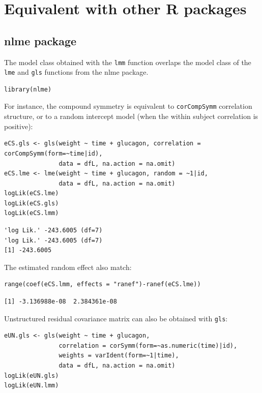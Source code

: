 \documentclass[12pt]{article}
\begin{document}
\clearpage

\section{Equivalent with other R packages}
\label{sec:orgfaaea55}

\subsection{nlme package}
\label{sec:org828ef19}

The model class obtained with the \texttt{lmm} function overlaps the model
class of the \texttt{lme} and \texttt{gls} functions from the nlme package.
\lstset{language=r,label= ,caption= ,captionpos=b,numbers=none}
\begin{lstlisting}
library(nlme)
\end{lstlisting}

For instance, the compound symmetry is equivalent to \texttt{corCompSymm}
correlation structure, or to a random intercept model (when the within
subject correlation is positive):
\lstset{language=r,label= ,caption= ,captionpos=b,numbers=none}
\begin{lstlisting}
eCS.gls <- gls(weight ~ time + glucagon, correlation = corCompSymm(form=~time|id),
               data = dfL, na.action = na.omit)
eCS.lme <- lme(weight ~ time + glucagon, random = ~1|id,
               data = dfL, na.action = na.omit)
logLik(eCS.lme)
logLik(eCS.gls)
logLik(eCS.lmm)
\end{lstlisting}

\begin{verbatim}
'log Lik.' -243.6005 (df=7)
'log Lik.' -243.6005 (df=7)
[1] -243.6005
\end{verbatim}


The estimated random effect also match:
\lstset{language=r,label= ,caption= ,captionpos=b,numbers=none}
\begin{lstlisting}
range(coef(eCS.lmm, effects = "ranef")-ranef(eCS.lme))
\end{lstlisting}

\begin{verbatim}
[1] -3.136988e-08  2.384361e-08
\end{verbatim}


Unstructured residual covariance matrix can also be obtained with
\texttt{gls}:
\lstset{language=r,label= ,caption= ,captionpos=b,numbers=none}
\begin{lstlisting}
eUN.gls <- gls(weight ~ time + glucagon,
               correlation = corSymm(form=~as.numeric(time)|id),
               weights = varIdent(form=~1|time),
               data = dfL, na.action = na.omit)
logLik(eUN.gls)
logLik(eUN.lmm)
\end{lstlisting}
\end{document}
